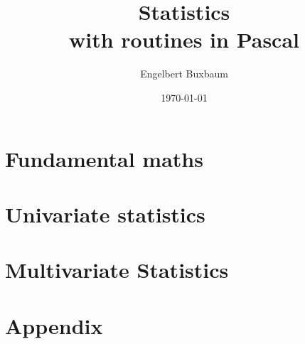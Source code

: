 \documentclass[twoside,12pt,british]{scrbook}
\title{Statistics\\ {\Large with routines in Pascal}}
\author{Engelbert Buxbaum }
\date{\today}
\begin{document}
\frontmatter
\maketitle
\tableofcontents

\mainmatter
\part{Fundamental maths}
  
  
  
  
  
  
     
     
     
  
\part{Univariate statistics}
  
  
  
  
  
  
  
\part{Multivariate Statistics}
  
  
     
     
     
  

\backmatter
\part{Appendix}
  
  
\end{document}
